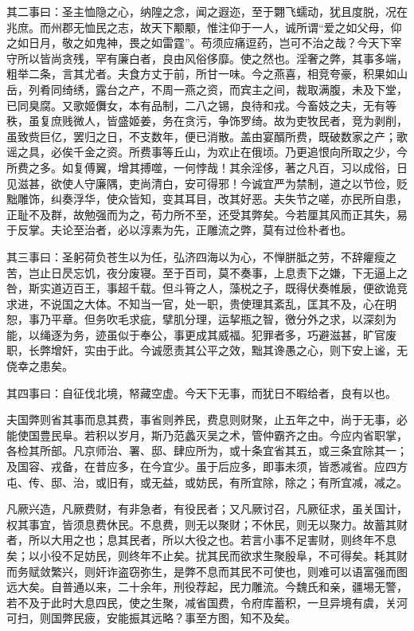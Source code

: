 \documentclass[12pt,UTF8]{ctexbook}
\begin{document}
其二事曰：圣主恤隐之心，纳隍之念，闻之遐迩，至于翾飞蠕动，犹且度脱，况在兆庶。而州郡无恤民之志，故天下颙颙，惟注仰于一人，诚所谓“爱之如父母，仰之如日月，敬之如鬼神，畏之如雷霆”。苟须应痛逗药，岂可不治之哉？今天下宰守所以皆尚贪残，罕有廉白者，良由风俗侈靡。使之然也。淫奢之弊，其事多端，粗举二条，言其尤者。夫食方丈于前，所甘一味。今之燕喜，相竞夸豪，积果如山岳，列肴同绮绣，露台之产，不周一燕之资，而宾主之间，裁取满腹，未及下堂，已同臭腐。又歌姬儛女，本有品制，二八之锡，良待和戎。今畜妓之夫，无有等秩，虽复庶贱微人，皆盛姬姜，务在贪污，争饰罗绮。故为吏牧民者，竞为剥削，虽致赀巨亿，罢归之日，不支数年，便已消散。盖由宴醑所费，既破数家之产；歌谣之具，必俟千金之资。所费事等丘山，为欢止在俄顷。乃更追恨向所取之少，今所费之多。如复傅翼，增其搏噬，一何悖哉！其余淫侈，著之凡百，习以成俗，日见滋甚，欲使人守廉隅，吏尚清白，安可得邪！今诚宜严为禁制，道之以节俭，贬黜雕饰，纠奏浮华，使众皆知，变其耳目，改其好恶。夫失节之嗟，亦民所自患，正耻不及群，故勉强而为之，苟力所不至，还受其弊矣。今若厘其风而正其失，易于反掌。夫论至治者，必以淳素为先，正雕流之弊，莫有过俭朴者也。

其三事曰：圣躬荷负苍生以为任，弘济四海以为心，不惮胼胝之劳，不辞癯瘦之苦，岂止日昃忘饥，夜分废寝。至于百司，莫不奏事，上息责下之嫌，下无逼上之咎，斯实道迈百王，事超千载。但斗筲之人，藻棁之子，既得伏奏帷扆，便欲诡竞求进，不说国之大体。不知当一官，处一职，贵使理其紊乱，匡其不及，心在明恕，事乃平章。但务吹毛求疵，擘肌分理，运挈瓶之智，徼分外之求，以深刻为能，以绳逐为务，迹虽似于奉公，事更成其威福。犯罪者多，巧避滋甚，旷官废职，长弊增奸，实由于此。今诚愿责其公平之效，黜其谗愚之心，则下安上谧，无侥幸之患矣。

其四事曰：自征伐北境，帑藏空虚。今天下无事，而犹日不暇给者，良有以也。

夫国弊则省其事而息其费，事省则养民，费息则财聚，止五年之中，尚于无事，必能使国豊民阜。若积以岁月，斯乃范蠡灭吴之术，管仲霸齐之由。今应内省职掌，各检其所部。凡京师治、署、邸、肆应所为，或十条宜省其五，或三条宜除其一；及国容、戎备，在昔应多，在今宜少。虽于后应多，即事未须，皆悉减省。应四方屯、传、邸、治，或旧有，或无益，或妨民，有所宜除，除之；有所宜减，减之。

凡厥兴造，凡厥费财，有非急者，有役民者；又凡厥讨召，凡厥征求，虽关国计，权其事宜，皆须息费休民。不息费，则无以聚财；不休民，则无以聚力。故蓄其财者，所以大用之也；息其民者，所以大役之也。若言小事不足害财，则终年不息矣；以小役不足妨民，则终年不止矣。扰其民而欲求生聚殷阜，不可得矣。耗其财而务赋敛繁兴，则奸诈盗窃弥生，是弊不息而其民不可使也，则难可以语富强而图远大矣。自普通以来，二十余年，刑役荐起，民力雕流。今魏氏和亲，疆埸无警，若不及于此时大息四民，使之生聚，减省国费，令府库蓄积，一旦异境有虞，关河可扫，则国弊民疲，安能振其远略？事至方图，知不及矣。
\end{document}
